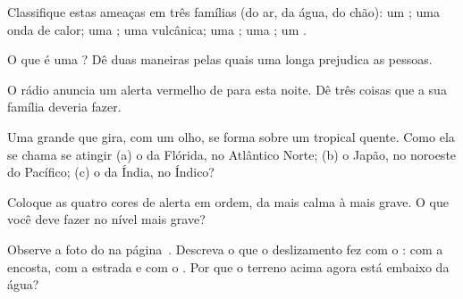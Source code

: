 \begin{exercise}[$\star$]\label{exo:g5:natural-hazards:2}
Classifique estas ameaças em três famílias (do ar, da água, do chão): um
; uma onda de calor; uma ; uma 
vulcânica; uma ; uma ; um .
\end{exercise}

\begin{exercise}[$\star$]\label{exo:g5:natural-hazards:3}
O que é uma ? Dê duas maneiras pelas quais uma  longa prejudica as pessoas.
\end{exercise}

\begin{exercise}[$\star$]\label{exo:g5:natural-hazards:4}
O rádio anuncia um alerta vermelho de  para esta noite. Dê três
coisas que a sua família deveria fazer.
\end{exercise}

\begin{exercise}[$\star$]\label{exo:g5:natural-hazards:5}
Uma grande  que gira, com um olho, se forma sobre um 
tropical quente. Como ela se chama se atingir (a) o  da Flórida, no
Atlântico Norte; (b) o Japão, no noroeste do Pacífico; (c) o  da
Índia, no  Índico?
\end{exercise}

\begin{exercise}[$\star$]\label{exo:g5:natural-hazards:6}
Coloque as quatro cores de alerta em ordem, da mais calma à mais grave. O
que você deve fazer no nível mais grave?
\end{exercise}

\begin{exercise}[$\star\star$]\label{exo:g5:natural-hazards:7}
Observe a foto do  na
página~\pageref{fig:g5:natural-hazards:landslide}. Descreva o que o
deslizamento fez com o : com a encosta, com a estrada e com o . Por
que o terreno  acima agora está embaixo da água?
\end{exercise}

